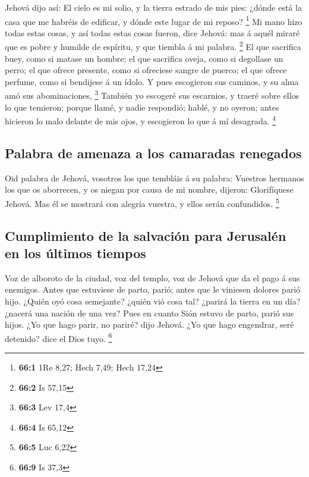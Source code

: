  Jehová dijo así: El cielo es mi solio, y la tierra estrado
de mis pies: ¿dónde está la casa que me habréis de edificar, y dónde
este lugar de mi reposo? \footnote{\textbf{66:1} 1Re 8,27; Hech 7,49;
  Hech 17,24}  Mi mano hizo todas estas cosas, y así todas
estas cosas fueron, dice Jehová: mas á aquél miraré que es pobre y
humilde de espíritu, y que tiembla á mi palabra. \footnote{\textbf{66:2}
  Is 57,15}  El que sacrifica buey, como si matase un
hombre; el que sacrifica oveja, como si degollase un perro; el que
ofrece presente, como si ofreciese sangre de puerco; el que ofrece
perfume, como si bendijese á un ídolo. Y pues escogieron sus caminos, y
su alma amó sus abominaciones, \footnote{\textbf{66:3} Lev 17,4}
 También yo escogeré sus escarnios, y traeré sobre ellos lo
que temieron; porque llamé, y nadie respondió; hablé, y no oyeron; antes
hicieron lo malo delante de mis ojos, y escogieron lo que á mí
desagrada. \footnote{\textbf{66:4} Is 65,12}

\hypertarget{palabra-de-amenaza-a-los-camaradas-renegados}{%
\subsection{Palabra de amenaza a los camaradas
renegados}\label{palabra-de-amenaza-a-los-camaradas-renegados}}

 Oid palabra de Jehová, vosotros los que tembláis á su
palabra: Vuestros hermanos los que os aborrecen, y os niegan por causa
de mi nombre, dijeron: Glorifíquese Jehová. Mas él se mostrará con
alegría vuestra, y ellos serán confundidos. \footnote{\textbf{66:5} Luc
  6,22}

\hypertarget{cumplimiento-de-la-salvaciuxf3n-para-jerusaluxe9n-en-los-uxfaltimos-tiempos}{%
\subsection{Cumplimiento de la salvación para Jerusalén en los últimos
tiempos}\label{cumplimiento-de-la-salvaciuxf3n-para-jerusaluxe9n-en-los-uxfaltimos-tiempos}}

 Voz de alboroto de la ciudad, voz del templo, voz de Jehová
que da el pago á sus enemigos.  Antes que estuviese de
parto, parió; antes que le viniesen dolores parió hijo. 
¿Quién oyó cosa semejante? ¿quién vió cosa tal? ¿parirá la tierra en un
día? ¿nacerá una nación de una vez? Pues en cuanto Sión estuvo de parto,
parió sus hijos.  ¿Yo que hago parir, no pariré? dijo
Jehová. ¿Yo que hago engendrar, seré detenido? dice el Dios tuyo.
\footnote{\textbf{66:9} Is 37,3}

